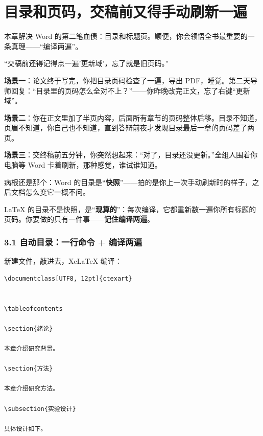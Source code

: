\chapter{目录和页码，交稿前又得手动刷新一遍}

\begin{notebox}
本章解决 Word 的第二笔血债：目录和标题页。顺便，你会领悟全书最重要的一条真理——“编译两遍”。
\end{notebox}


“交稿前还得记得点一遍'更新域'，忘了就是旧页码。”


\textbf{场景一}：论文终于写完，你把目录页码检查了一遍，导出 PDF，睡觉。第二天导师回复：“目录里的页码怎么全对不上？”——你昨晚改完正文，忘了右键“更新域”。

\textbf{场景二}：你在正文里加了半页内容，后面所有章节的页码整体后移。目录不知道，页眉不知道，你自己也不知道，直到答辩前夜才发现目录最后一章的页码差了两页。

\textbf{场景三}：交终稿前五分钟，你突然想起来：“对了，目录还没更新。”全组人围着你电脑等 Word 卡着刷新，那种感觉，谁试谁知道。

病根还是那个：Word 的目录是“\textbf{快照}”——拍的是你上一次手动刷新时的样子，之后文档怎么变它一概不问。

LaTeX 的目录不是快照，是“\textbf{现算的}”：每次编译，它都重新数一遍你所有标题的页码。你要做的只有一件事——\textbf{记住编译两遍}。


\subsection*{3.1 自动目录：一行命令 + 编译两遍}

新建文件，敲进去，XeLaTeX 编译：

\begin{lstlisting}
\documentclass[UTF8, 12pt]{ctexart}


\tableofcontents

\section{绪论}

本章介绍研究背景。

\section{方法}

本章介绍研究方法。

\subsection{实验设计}

具体设计如下。


\end{lstlisting}

